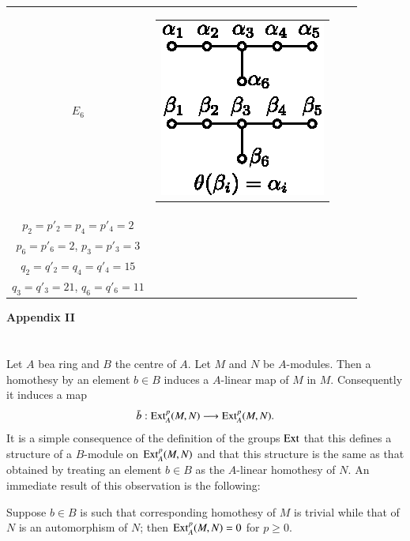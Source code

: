 {\begin{longtable}{@{}|c|c|l|l|@{}}
$E_6$ & 
\begin{tabular}{c}
{\includegraphics[scale=0.8]{318g.eps}}
\end{tabular}&
\begin{tabular}{l}
$p_1 = p'_1 = p_5 = p'_5 = 1$,\\
$p_2 = p'_2 = p_4 = p'_4 = 2$\\
$p_6 = p'_6 = 2$, $p_3 = p'_3 = 3$
\end{tabular} & 
\begin{tabular}{l}
$q_1 = q'_1 = q_5 = q'_5 = 16$,\\
$q_2 = q'_2 = q_4 = q'_4 = 15$\\
$q_3 = q'_3 = 21$, $q_6 = q'_6 = 11$
\end{tabular}\\\hline
\end{longtable}}\relax

\begin{center}
{\textbf{\Large{Appendix II}}}
\end{center}

\section{}%
Let $A$ be\pageoriginale a ring and $B$ the centre of $A$. Let $M$ and $N$ be $A$-modules. Then a homothesy by an element $b \in B$ induces a $A$-linear map of $M$ in $M$. Consequently it induces a map
$$
\bar{b} : \operatorname{Ext}^p_A (M,N) \longrightarrow \operatorname{Ext}^p_A (M,N).
$$
It is a simple consequence of the definition of the groups $\operatorname{Ext}$ that this defines a structure of a $B$-module on $\operatorname{Ext}^p_A (M,N)$ and that this structure is the same as that obtained by treating an element $b \in B$ as the $A$-linear homothesy of $N$. An immediate result of this observation is the following:

\setcounter{appenprop}{7}
\begin{appenprop}\label{art9-appenpropA8}
Suppose $b \in B$ is such that corresponding homothesy of $M$ is trivial while that of $N$ is an automorphism of $N$; then $\operatorname{Ext}^p_A (M,N) = 0$ for $p \geqslant 0$.
\end{appenprop}

